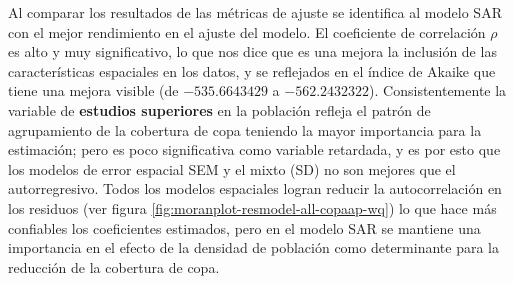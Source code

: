 \documentclass[12pt,]{book}
\begin{document}
Al comparar los resultados de las métricas de ajuste se identifica al
modelo SAR con el mejor rendimiento en el ajuste del modelo. El
coeficiente de correlación \(\rho\) es alto y muy significativo, lo que
nos dice que es una mejora la inclusión de las características
espaciales en los datos, y se reflejados en el índice de Akaike que
tiene una mejora visible (de \(-535.6643429\) a \(-562.2432322\)).
Consistentemente la variable de \textbf{estudios superiores} en la
población refleja el patrón de agrupamiento de la cobertura de copa
teniendo la mayor importancia para la estimación; pero es poco
significativa como variable retardada, y es por esto que los modelos de
error espacial SEM y el mixto (SD) no son mejores que el autorregresivo.
Todos los modelos espaciales logran reducir la autocorrelación en los
residuos (ver figura \ref{fig:moranplot-resmodel-all-copaap-wq}) lo que
hace más confiables los coeficientes estimados, pero en el modelo SAR se
mantiene una importancia en el efecto de la densidad de población como
determinante para la reducción de la cobertura de copa.
\end{document}
